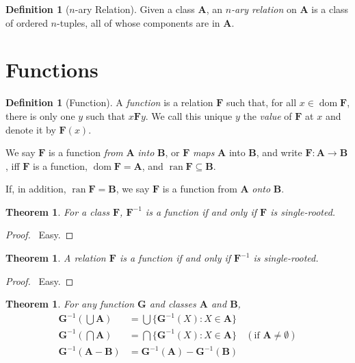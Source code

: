 \documentclass{article}
\let\qed\relax
\newtheorem{theorem}[axiom]{Theorem}
\theoremstyle{definition}
\newtheorem{definition}[axiom]{Definition}
\newcommand{\dom}{\ensuremath{\operatorname{dom}}}
\newcommand{\inv}[1]{\ensuremath{{#1}^{-1}}}
\newcommand{\ran}{\ensuremath{\operatorname{ran}}}
\begin{document}
    \begin{definition}[$n$-ary Relation]
        Given a class $\mathbf{A}$, an \emph{$n$-ary relation} on $\mathbf{A}$ is a class of ordered
        $n$-tuples, all of whose components are in $\mathbf{A}$.
    \end{definition}

    \section{Functions}

    \begin{definition}[Function]
        A \emph{function} is a relation $\mathbf{F}$ such that, for all $x \in \dom \mathbf{F}$,
        there is only one $y$ such that $x \mathbf{F} y$. We call this unique $y$ the \emph{value}
        of $\mathbf{F}$ at $x$ and denote it by $\mathbf{F}(x)$.

        We say $\mathbf{F}$ is a function \emph{from} $\mathbf{A}$ \emph{into} $\mathbf{B}$,
        or $\mathbf{F}$ \emph{maps} $\mathbf{A}$ into $\mathbf{B}$, and write $\mathbf{F} : \mathbf{A}
        \rightarrow \mathbf{B}$, iff $\mathbf{F}$ is a function, $\dom \mathbf{F} = \mathbf{A}$,
        and $\ran \mathbf{F} \subseteq \mathbf{B}$.

        If, in addition, $\ran \mathbf{F} = \mathbf{B}$, we say $\mathbf{F}$ is a function from $\mathbf{A}$
        \emph{onto} $\mathbf{B}$.
    \end{definition}

    \begin{theorem}
        For a class $\mathbf{F}$, $\inv{\mathbf{F}}$ is a function if and only if $\mathbf{F}$ is single-rooted.
    \end{theorem}

    \begin{proof}
        \pf\ Easy. \qed
    \end{proof}

    \begin{theorem}
        A relation $\mathbf{F}$ is a function if and only if $\inv{\mathbf{F}}$ is single-rooted.
    \end{theorem}

    \begin{proof}
        \pf\ Easy. \qed
    \end{proof}

    \begin{theorem}
        For any function $\mathbf{G}$ and classes $\mathbf{A}$ and $\mathbf{B}$,
        \begin{align*}
            \inv{\mathbf{G}}(\bigcup \mathbf{A}) & = \bigcup \{ \inv{\mathbf{G}}(X) : X \in \mathbf{A} \} \\
            \inv{\mathbf{G}}(\bigcap \mathbf{A}) & = \bigcap \{ \inv{\mathbf{G}}(X) : X \in \mathbf{A} \} &
            (\text{if } \mathbf{A} \neq \emptyset) \\
            \inv{\mathbf{G}}(\mathbf{A} - \mathbf{B}) & = \inv{\mathbf{G}}(\mathbf{A}) - \inv{\mathbf{G}}(\mathbf{B})
        \end{align*}
    \end{theorem}
\end{document}
